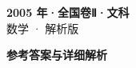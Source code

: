 \documentclass[zihao=-4, a4paper]{ctexart}
\begin{document}
\begin{center}
  {\Large\bfseries 2005 年·全国卷Ⅱ·文科}\\[4pt]
  {\large 数学 · 解析版}
\end{center}
\medskip
{}

\clearpage
{}
\begin{center}{\Large\bfseries 参考答案与详细解析}\end{center}
\medskip

\end{document}
